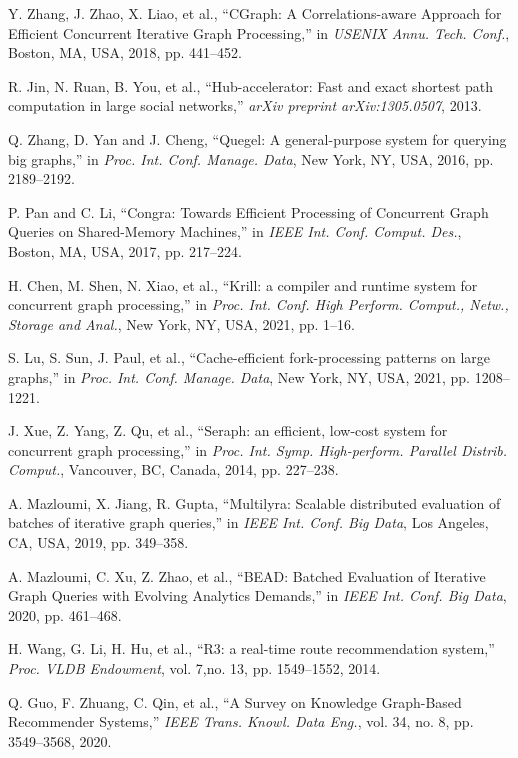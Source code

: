 \documentclass[lettersize,journal]{IEEEtran}
\begin{document}
\begin{thebibliography}{100}
Y. Zhang, J. Zhao, X. Liao, et al., ``{CGraph}: A Correlations-aware Approach for Efficient Concurrent Iterative Graph Processing,'' in \textit{USENIX Annu. Tech. Conf.}, Boston, MA, USA, 2018, pp. 441--452.

R. Jin, N. Ruan, B. You, et al., ``Hub-accelerator: Fast and exact shortest path computation in large social networks,'' \textit{arXiv preprint arXiv:1305.0507}, 2013.

Q. Zhang, D. Yan and J. Cheng, ``Quegel: A general-purpose system for querying big graphs,'' in \textit{Proc. Int. Conf. Manage. Data}, New York, NY, USA, 2016, pp. 2189--2192.

P. Pan and C. Li, ``Congra: Towards Efficient Processing of Concurrent Graph Queries on Shared-Memory Machines,'' in \textit{IEEE Int. Conf. Comput. Des.}, Boston, MA, USA, 2017, pp. 217--224.

H. Chen, M. Shen, N. Xiao, et al., ``Krill: a compiler and runtime system for concurrent graph processing,'' in \textit{Proc. Int. Conf. High Perform. Comput., Netw., Storage and Anal.}, New York, NY, USA, 2021, pp. 1--16.

S. Lu, S. Sun, J. Paul, et al., ``Cache-efficient fork-processing patterns on large graphs,'' in \textit{Proc. Int. Conf. Manage. Data}, New York, NY, USA, 2021, pp. 1208--1221.

J. Xue, Z. Yang, Z. Qu, et al., ``Seraph: an efficient, low-cost system for concurrent graph processing,'' in \textit{Proc. Int. Symp. High-perform. Parallel Distrib. Comput.}, Vancouver, BC, Canada, 2014, pp. 227--238.

A. Mazloumi, X. Jiang, R. Gupta, ``Multilyra: Scalable distributed evaluation of batches of iterative graph queries,'' in \textit{IEEE Int. Conf. Big Data}, Los Angeles, CA, USA, 2019, pp. 349--358.

A. Mazloumi, C. Xu, Z. Zhao, et al., ``BEAD: Batched Evaluation of Iterative Graph Queries with Evolving Analytics Demands,'' in \textit{IEEE Int. Conf. Big Data}, 2020, pp. 461--468.

H. Wang, G. Li, H. Hu, et al., ``R3: a real-time route recommendation system,'' \textit{Proc. VLDB Endowment}, vol. 7,no. 13, pp. 1549--1552, 2014.

Q. Guo, F. Zhuang, C. Qin, et al., ``A Survey on Knowledge Graph-Based Recommender Systems,'' \textit{IEEE Trans. Knowl. Data Eng.}, vol. 34, no. 8, pp. 3549--3568, 2020.



\end{thebibliography}
\end{document}
